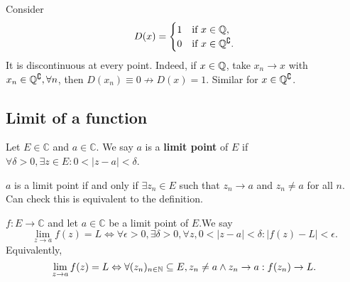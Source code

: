 \begin{example}
    Consider 
    \[
        D(x) = \begin{cases}
        1 &\text{if }x\in \mathbb{Q}, \\
        0 &\text{if }x\in {\mathbb{Q}}^\complement.\\
        \end{cases} 
    \]
    It is discontinuous at every point. Indeed, if $x\in {\mathbb{Q}}$, take $x_n\to x$ with $ x_n\in {\mathbb{Q}}^\complement,\forall n $, then $ D(x_n)\equiv 0 \nrightarrow D(x)=1 $. Similar for $ x\in {\mathbb{Q}}^\complement $.
\end{example}

\subsection{Limit of a function}
\begin{definition}
    Let $ E\in \mathbb{C} $ and $ a\in \mathbb{C} $. We say $a$ is a \textbf{limit point} of $E$ if $ \forall \delta>0, \exists z\in E: 0<\left| z-a \right| <\delta $.
    \begin{center}
    \end{center}
\end{definition}
\begin{remark}
    $a$ is a limit point if and only if $ \exists z_n\in E $ such that $ z_n\to a $ and $ z_n\neq a $ for all $n$. Can check this is equivalent to the definition.
\end{remark}

\begin{definition}
    $ f:E\to \mathbb{C} $ and let $ a\in \mathbb{C} $ be a limit point of $E$.We say 
    \[
        \lim_{z \to a} f(z) = L \Longleftrightarrow \forall \epsilon>0, \exists \delta>0, \forall z,0< \left| z-a \right| <\delta: \left| f(z)-L \right|< \epsilon.
    \]
    Equivalently,
    \[
        \lim_{z \to a} f(z)=L \Leftrightarrow \forall (z_n)_{n\in{\mathbb{N}}} \subseteq E, z_n\neq a \land z_n\to a: f(z_n)\to L.
    \]
\end{definition}

